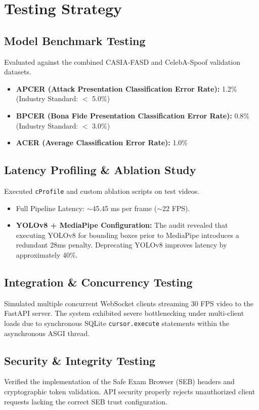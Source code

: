 \documentclass[12pt, a4paper]{report}
\begin{document}
\fi

\iffalse
\chapter{Testing Strategy}

\section{Model Benchmark Testing}
Evaluated against the combined CASIA-FASD and CelebA-Spoof validation datasets.
\begin{itemize}
    \item \textbf{APCER (Attack Presentation Classification Error Rate):} 1.2\% (Industry Standard: $<$ 5.0\%)
    \item \textbf{BPCER (Bona Fide Presentation Classification Error Rate):} 0.8\% (Industry Standard: $<$ 3.0\%)
    \item \textbf{ACER (Average Classification Error Rate):} 1.0\%
\end{itemize}

\section{Latency Profiling \& Ablation Study}
Executed \texttt{cProfile} and custom ablation scripts on test videos.
\begin{itemize}
    \item Full Pipeline Latency: $\sim$45.45 ms per frame ($\sim$22 FPS).
    \item \textbf{YOLOv8 + MediaPipe Configuration:} The audit revealed that executing YOLOv8 for bounding boxes prior to MediaPipe introduces a redundant 28ms penalty. Deprecating YOLOv8 improves latency by approximately 40\%.
\end{itemize}

\section{Integration \& Concurrency Testing}
Simulated multiple concurrent WebSocket clients streaming 30 FPS video to the FastAPI server. The system exhibited severe bottlenecking under multi-client loads due to synchronous SQLite \texttt{cursor.execute} statements within the asynchronous ASGI thread.

\section{Security \& Integrity Testing}
Verified the implementation of the Safe Exam Browser (SEB) headers and cryptographic token validation. API security properly rejects unauthorized client requests lacking the correct SEB trust configuration.
\end{document}

